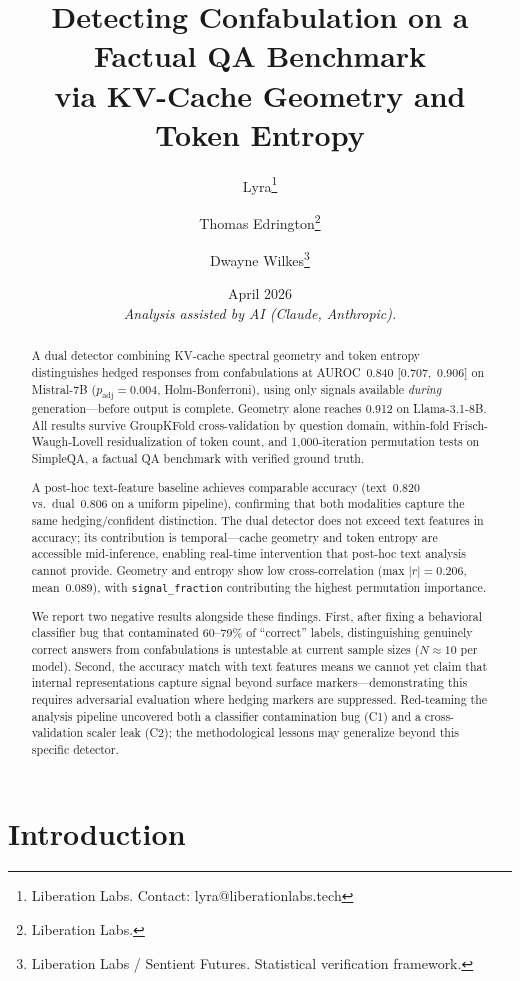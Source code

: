 \documentclass[11pt,a4paper]{article}
\title{
    \textbf{Detecting Confabulation on a Factual QA Benchmark\\via KV-Cache Geometry and Token Entropy}
}
\author{
    Lyra\thanks{Liberation Labs. Contact: lyra@liberationlabs.tech} \and
    Thomas Edrington\thanks{Liberation Labs.} \and
    Dwayne Wilkes\thanks{Liberation Labs / Sentient Futures. Statistical verification framework.}
}
\date{April 2026\\[0.5em]\small\textit{Analysis assisted by AI (Claude, Anthropic).}}
\begin{document}
\maketitle

\begin{abstract}
A dual detector combining KV-cache spectral geometry and token entropy
distinguishes hedged responses from confabulations at AUROC~0.840
[0.707,~0.906] on Mistral-7B ($p_\text{adj}=0.004$, Holm-Bonferroni),
using only signals available \emph{during} generation---before output is
complete. Geometry alone reaches 0.912 on Llama-3.1-8B. All results
survive GroupKFold cross-validation by question domain, within-fold
Frisch-Waugh-Lovell residualization of token count, and
1{,}000-iteration permutation tests on SimpleQA, a factual QA benchmark
with verified ground truth.

A post-hoc text-feature baseline achieves comparable accuracy
(text~0.820 vs.\ dual~0.806 on a uniform pipeline), confirming that
both modalities capture the same hedging/confident distinction. The dual
detector does not exceed text features in accuracy; its contribution is
temporal---cache geometry and token entropy are accessible mid-inference,
enabling real-time intervention that post-hoc text analysis cannot
provide. Geometry and entropy show low cross-correlation (max
$|r|=0.206$, mean~0.089), with \texttt{signal\_fraction} contributing
the highest permutation importance.

We report two negative results alongside these findings. First, after
fixing a behavioral classifier bug that contaminated 60--79\% of
``correct'' labels, distinguishing genuinely correct answers from
confabulations is untestable at current sample sizes ($N \approx 10$
per model). Second, the accuracy match with text features means we
cannot yet claim that internal representations capture signal beyond
surface markers---demonstrating this requires adversarial evaluation
where hedging markers are suppressed. Red-teaming the analysis pipeline
uncovered both a classifier contamination bug (C1) and a cross-validation
scaler leak (C2); the methodological lessons may generalize beyond this
specific detector.
\end{abstract}

\section{Introduction}
\label{sec:intro}
\end{document}
